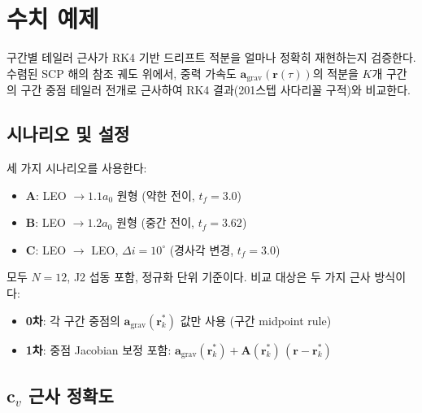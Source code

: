 \documentclass[11pt]{article}
\begin{document}
\section{수치 예제}
\label{sec:numerical}

구간별 테일러 근사가 RK4 기반 드리프트 적분을 얼마나 정확히
재현하는지 검증한다.
수렴된 SCP 해의 참조 궤도 위에서, 중력 가속도 $\mathbf{a}_\text{grav}(\mathbf{r}(\tau))$의
적분을 $K$개 구간의 구간 중점 테일러 전개로 근사하여
RK4 결과(201스텝 사다리꼴 구적)와 비교한다.

\subsection{시나리오 및 설정}

세 가지 시나리오를 사용한다:

\begin{itemize}
  \item \textbf{A}: LEO $\to 1.1a_0$ 원형 (약한 전이, $t_f=3.0$)
  \item \textbf{B}: LEO $\to 1.2a_0$ 원형 (중간 전이, $t_f=3.62$)
  \item \textbf{C}: LEO $\to$ LEO, $\Delta i=10^\circ$ (경사각 변경, $t_f=3.0$)
\end{itemize}

모두 $N=12$, J2 섭동 포함, 정규화 단위 기준이다.
비교 대상은 두 가지 근사 방식이다:
\begin{itemize}
  \item \textbf{0차}: 각 구간 중점의 $\mathbf{a}_\text{grav}(\mathbf{r}_k^*)$ 값만 사용
        (구간 midpoint rule)
  \item \textbf{1차}: 중점 Jacobian 보정 포함:
        $\mathbf{a}_\text{grav}(\mathbf{r}_k^*) + \mathbf{A}(\mathbf{r}_k^*)\,(\mathbf{r} - \mathbf{r}_k^*)$
\end{itemize}

\subsection{$\mathbf{c}_v$ 근사 정확도}
\end{document}
